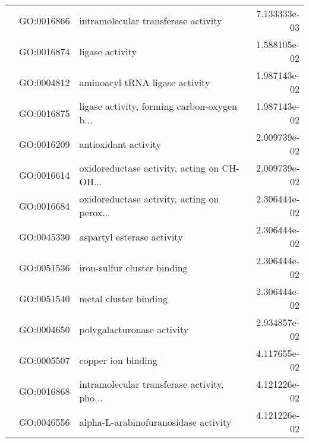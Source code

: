 \begin{longtable}{lllr}
   & GO:0016866 &          intramolecular transferase activity &  7.133333e-03 \\
   & GO:0016874 &                              ligase activity &  1.588105e-02 \\
   & GO:0004812 &               aminoacyl-tRNA ligase activity &  1.987143e-02 \\
   & GO:0016875 &  ligase activity, forming carbon-oxygen b... &  1.987143e-02 \\
   & GO:0016209 &                         antioxidant activity &  2.009739e-02 \\
   & GO:0016614 &  oxidoreductase activity, acting on CH-OH... &  2.009739e-02 \\
   & GO:0016684 &  oxidoreductase activity, acting on perox... &  2.306444e-02 \\
   & GO:0045330 &                   aspartyl esterase activity &  2.306444e-02 \\
   & GO:0051536 &                  iron-sulfur cluster binding &  2.306444e-02 \\
   & GO:0051540 &                        metal cluster binding &  2.306444e-02 \\
   & GO:0004650 &                   polygalacturonase activity &  2.934857e-02 \\
   & GO:0005507 &                           copper ion binding &  4.117655e-02 \\
   & GO:0016868 &  intramolecular transferase activity, pho... &  4.121226e-02 \\
   & GO:0046556 &         alpha-L-arabinofuranosidase activity &  4.121226e-02 \\
\end{longtable}
